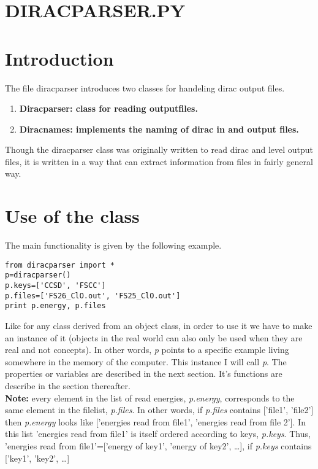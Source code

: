 \documentclass[a4paper, fleqn]{article}
\begin{document}
\section*{DIRACPARSER.PY}

\section{Introduction}

The file diracparser introduces two classes for handeling dirac output files. 
\begin{enumerate}
\item \textbf{Diracparser: class for reading outputfiles.}
\item \textbf{Diracnames: implements the naming of dirac in and output files.}
\end{enumerate}
Though the diracparser class was originally written to read dirac and level output files, it is written in a way that can extract information from files in fairly general way.

\section{Use of the class}
The main functionality is given by the following example. 
\indent \begin{verbatim}
from diracparser import *
p=diracparser()
p.keys=['CCSD', 'FSCC']
p.files=['FS26_ClO.out', 'FS25_ClO.out']
print p.energy, p.files
\end{verbatim}
Like for any class derived from an object class, in order to use it we have to make an instance of it (objects in the real world can also only be used when they are real and not concepts). In other words, \textit{p} points to a specific example living somewhere in the memory of the computer. This instance I will call \textit{p}. The properties or variables are described in the next section. It's functions are describe in the section thereafter.  \\
\textbf{Note:} every element in the list of read energies, \textit{p.energy}, corresponds to the same element in the filelist, \textit{p.files}. In other words, if \textit{p.files} contains ['file1', 'file2'] then \textit{p.energy} looks like ['energies read from file1', 'energies read from file 2']. In this list 'energies read from file1' is itself ordered according to keys, \textit{p.keys}. Thus, 'energies read from file1'=['energy of key1', 'energy of key2', \ldots], if \textit{p.keys} contains ['key1', 'key2', \ldots]
\end{document}
